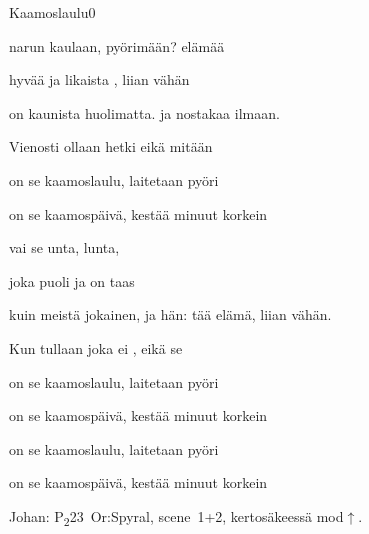 \documentclass[12pt,a4paper]{article}
\begin{document}
\thispagestyle{empty}
\begin{mysong}{Kaamoslaulu}{0}


\begin{SBVerse}
   narun kaulaan,  pyörimään?
   elämää 

  hyvää ja  likaista , liian vähän

   on kaunista  huolimatta. 
  ja nostakaa  ilmaan.

  Vienosti  ollaan hetki  eikä mitään
\end{SBVerse}

\begin{SBChorus}
   on se kaamoslaulu,  laitetaan
   pyöri

   on se kaamospäivä,  kestää 
  minuut korkein
\end{SBChorus}

\begin{SBVerse}
    vai  se unta,
   lunta,

  joka  puoli ja on taas 

   kuin meistä jokainen,  ja hän:  tää
  elämä,  liian vähän.

  Kun tullaan  joka ei , eikä se 
\end{SBVerse}

\begin{SBChorus}
   on se kaamoslaulu,  laitetaan
   pyöri

   on se kaamospäivä,  kestää 
  minuut korkein
\end{SBChorus}


\begin{SBChorus}
   on se kaamoslaulu,  laitetaan
   pyöri

   on se kaamospäivä,  kestää 
  minuut korkein
\end{SBChorus}


{\SBLyricNoteFont Johan: P\textsubscript{2}23~Or:Spyral, scene~1+2,
kertosäkeessä mod$\uparrow$.}

\end{mysong}
\end{document}
